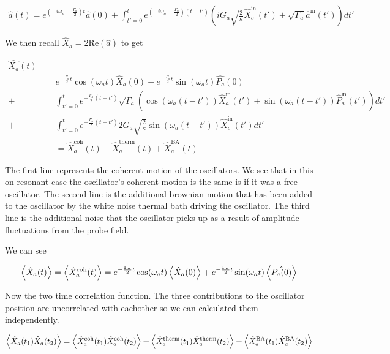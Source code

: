 \documentclass[12pt]{article}
\begin{document}
\begin{align}
\hat{a}(t) = e^{\left(-i\omega_a - \frac{\Gamma_a}{2}\right)t}\hat{a}(0) + \int_{t'=0}^t e^{\left(-i\omega_a - \frac{\Gamma_a}{2}\right)(t-t')} \left(iG_a\sqrt{\frac{2}{\kappa}} \hat{X}_c^{\text{in}}(t') + \sqrt{\Gamma_a}\hat{a}^{\text{in}}(t')\right) dt'
\end{align}

We then recall $\hat{X}_a = 2 \text{Re}(\hat{a})$ to get

\begin{align}
\hat{X_a}(t) =&\\ 
&e^{-\frac{\Gamma_a}{2} t} \cos(\omega_a t) \hat{X}_a(0) + e^{-\frac{\Gamma_a}{2} t} \sin(\omega_a t) \hat{P_a}(0)\\
+&\int_{t'=0}^{t}e^{-\frac{\Gamma_a}{2}(t-t')}\sqrt{\Gamma_a}\left(\cos(\omega_a(t-t'))\hat{X}_a^{\text{in}}(t') + \sin(\omega_a(t-t'))\hat{P}_a^{\text{in}}(t') \right) dt'\\
+&\int_{t'=0}^t e^{-\frac{\Gamma_a}{2}(t-t')} 2G_a \sqrt{\frac{2}{\kappa}} \sin(\omega_a(t-t'))\hat{X}_c^{\text{in}}(t') dt'\\
&= \hat{X}_a^{\text{coh}}(t) + \hat{X}_a^{\text{therm}}(t) + \hat{X}_a^{\text{BA}}(t)
\end{align}

The first line represents the coherent motion of the oscillators. We see that in this on resonant case the oscillator's coherent motion is the same is if it was a free oscillator. The second line is the additional brownian motion that has been added to the oscillator by the white noise thermal bath driving the oscillator. The third line is the additional noise that the oscillator picks up as a result of amplitude fluctuations from the probe field.

We can see

\begin{align}
\Braket{\hat{X}_a(t)} = \Braket{\hat{X}_a^{\text{coh}}(t)} = e^{-\frac{\Gamma_a}{2} t} \cos(\omega_a t) \Braket{\hat{X}_a(0)} + e^{-\frac{\Gamma_a}{2} t} \sin(\omega_a t) \Braket{\hat{P_a(0)}}\\
\end{align}

Now the two time correlation function. The three contributions to the oscillator position are uncorrelated with eachother so we can calculated them independently.

\begin{align}
\Braket{\hat{X}_a(t_1)\hat{X}_a(t_2)} = \Braket{\hat{X}^{\text{coh}}_a(t_1)\hat{X}^{\text{coh}}_a(t_2)} + \Braket{\hat{X}^{\text{therm}}_a(t_1)\hat{X}^{\text{therm}}_a(t_2)} + \Braket{\hat{X}^{\text{BA}}_a(t_1)\hat{X}^{\text{BA}}_a(t_2)}
\end{align}
\end{document}
